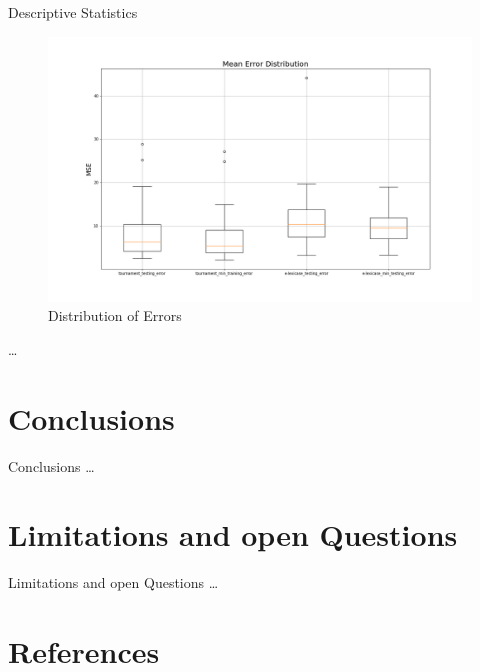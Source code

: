 \documentclass[
  ignorenonframetext,
]{beamer}
\begin{document}
\begin{frame}{Descriptive Statistics}
\protect\hypertarget{descriptive-statistics}{}
\begin{figure}
\centering
\includegraphics{../plots/mean_error_boxplot_all.png}
\caption{Distribution of Errors}
\end{figure}

\ldots{}
\end{frame}

\hypertarget{conclusions}{%
\section{Conclusions}\label{conclusions}}

\begin{frame}{Conclusions}
\ldots{}
\end{frame}

\hypertarget{limitations-and-open-questions}{%
\section{Limitations and open
Questions}\label{limitations-and-open-questions}}

\begin{frame}{Limitations and open Questions}
\ldots{}
\end{frame}

\hypertarget{references}{%
\section{References}\label{references}}
\end{document}
